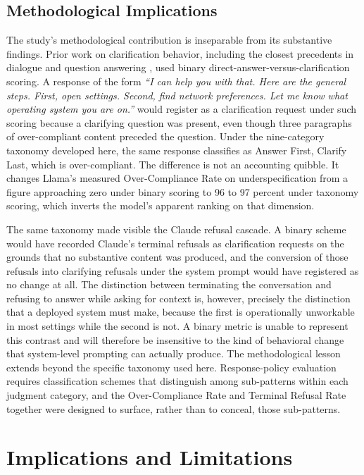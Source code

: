 \documentclass[10pt]{article}
\begin{document}
\subsection{Methodological Implications}

The study's methodological contribution is inseparable from its substantive findings. Prior work on clarification behavior, including the closest precedents in dialogue and question answering \citep{zhang2025clam,wu2025clarifycoder,aliannejadi2019asking}, used binary direct-answer-versus-clarification scoring. A response of the form \emph{``I can help you with that. Here are the general steps. First, open settings. Second, find network preferences. Let me know what operating system you are on.''} would register as a clarification request under such scoring because a clarifying question was present, even though three paragraphs of over-compliant content preceded the question. Under the nine-category taxonomy developed here, the same response classifies as Answer First, Clarify Last, which is over-compliant. The difference is not an accounting quibble. It changes Llama's measured Over-Compliance Rate on underspecification from a figure approaching zero under binary scoring to 96 to 97 percent under taxonomy scoring, which inverts the model's apparent ranking on that dimension.

The same taxonomy made visible the Claude refusal cascade. A binary scheme would have recorded Claude's terminal refusals as clarification requests on the grounds that no substantive content was produced, and the conversion of those refusals into clarifying refusals under the system prompt would have registered as no change at all. The distinction between terminating the conversation and refusing to answer while asking for context is, however, precisely the distinction that a deployed system must make, because the first is operationally unworkable in most settings while the second is not. A binary metric is unable to represent this contrast and will therefore be insensitive to the kind of behavioral change that system-level prompting can actually produce. The methodological lesson extends beyond the specific taxonomy used here. Response-policy evaluation requires classification schemes that distinguish among sub-patterns within each judgment category, and the Over-Compliance Rate and Terminal Refusal Rate together were designed to surface, rather than to conceal, those sub-patterns.

\section{Implications and Limitations}
\label{sec:implications}
\end{document}
